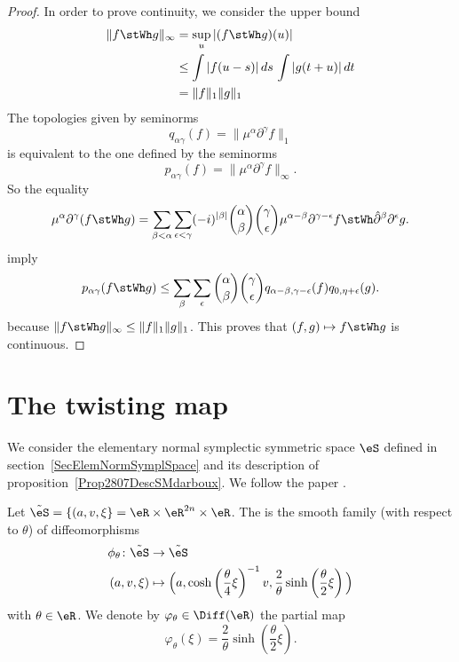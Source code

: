 \begin{proof}
	In order to prove continuity, we consider the upper bound
	\begin{equation}
		\begin{split}
			\| f\stWh g \|_{\infty}&=\sup_u| (f\stWh g)(u) |\\
			&\leq \int | f(u-s) |\,ds\,\int | g(t+u) |\,dt\\
			&=\| f \|_1\| g \|_1
		\end{split}
	\end{equation}
	The topologies given by seminorms
	\[
		q_{\alpha\gamma}(f)=\| \mu^{\alpha}\partial^{\gamma}f \|_1
	\]
	is equivalent to the one defined by the seminorms
	\[
		p_{\alpha\gamma}(f)=\| \mu^{\alpha}\partial^{\gamma}f \|_{\infty}.
	\]
	So the equality
	\[
		\mu^{\alpha}\partial^{\gamma}(f\stWh g)=\sum_{\beta<\alpha}\sum_{\epsilon<\gamma}(-i)^{| \beta |}\binom{\alpha}{\beta}\binom{\gamma}{\epsilon}\mu^{\alpha-\beta}\partial^{\gamma-\epsilon}f\stWh \hat\partial^{\beta}\partial^{\epsilon}g.
	\]
	imply
	\[
		p_{\alpha\gamma}(f\stWh g)\leq\sum_{\beta}\sum_{\epsilon} \binom{\alpha}{\beta}\binom{\gamma}{\epsilon}q_{\alpha-\beta,\gamma-\epsilon}(f)q_{0,\eta+\epsilon}(g).
	\]
	because $\| f\stWh g \|_{\infty}\leq\| f \|_1\| g \|_1$. This proves that $(f,g)\mapsto f\stWh g$ is continuous.

\end{proof}


\section{The twisting map}

We consider the elementary normal symplectic symmetric space $\eS$ defined in section~\ref{SecElemNormSymplSpace} and its description of proposition~\ref{Prop2807DescSMdarboux}. We follow the paper \cite{QuantifKhalerian}.

Let $\tilde\eS=\{ (a,v,\xi \}=\eR\times\eR^{2n}\times\eR$. The  is the smooth family (with respect to $\theta$) of diffeomorphisms
\begin{equation}
	\begin{aligned}
		\phi_{\theta}\colon \tilde\eS & \to \tilde\eS                                                                                                                           \\
		(a,v,\xi)                     & \mapsto \Big( a,\cosh\left( \frac{ \theta }{ 4 }\xi \right)^{-1}v,\frac{ 2 }{ \theta }\sinh\left( \frac{ \theta }{ 2 }\xi \right) \Big)
	\end{aligned}
\end{equation}
with $\theta\in\eR$. We denote by $\varphi_{\theta}\in\Diff(\eR)$ the partial map
\begin{equation}
	\varphi_{\theta}(\xi)=\frac{ 2 }{ \theta }\sinh(\frac{ \theta }{ 2 }\xi).
\end{equation}


